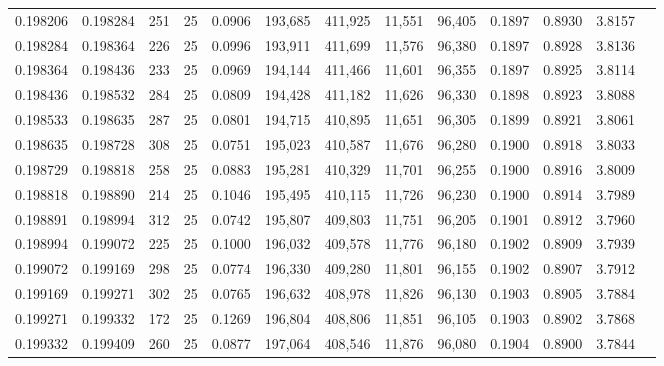 \begin{tabular}{rrrrrrrrrrrrr}
0.198206 & 0.198284 &   251 &  25 &                                     0.0906 & 193,685 & 411,925 &  11,551 &  96,405 & 0.1897 & 0.8930 & 3.8157 \\
0.198284 & 0.198364 &   226 &  25 &                                     0.0996 & 193,911 & 411,699 &  11,576 &  96,380 & 0.1897 & 0.8928 & 3.8136 \\
0.198364 & 0.198436 &   233 &  25 &                                     0.0969 & 194,144 & 411,466 &  11,601 &  96,355 & 0.1897 & 0.8925 & 3.8114 \\
0.198436 & 0.198532 &   284 &  25 &                                     0.0809 & 194,428 & 411,182 &  11,626 &  96,330 & 0.1898 & 0.8923 & 3.8088 \\
0.198533 & 0.198635 &   287 &  25 &                                     0.0801 & 194,715 & 410,895 &  11,651 &  96,305 & 0.1899 & 0.8921 & 3.8061 \\
0.198635 & 0.198728 &   308 &  25 &                                     0.0751 & 195,023 & 410,587 &  11,676 &  96,280 & 0.1900 & 0.8918 & 3.8033 \\
0.198729 & 0.198818 &   258 &  25 &                                     0.0883 & 195,281 & 410,329 &  11,701 &  96,255 & 0.1900 & 0.8916 & 3.8009 \\
0.198818 & 0.198890 &   214 &  25 &                                     0.1046 & 195,495 & 410,115 &  11,726 &  96,230 & 0.1900 & 0.8914 & 3.7989 \\
0.198891 & 0.198994 &   312 &  25 &                                     0.0742 & 195,807 & 409,803 &  11,751 &  96,205 & 0.1901 & 0.8912 & 3.7960 \\
0.198994 & 0.199072 &   225 &  25 &                                     0.1000 & 196,032 & 409,578 &  11,776 &  96,180 & 0.1902 & 0.8909 & 3.7939 \\
0.199072 & 0.199169 &   298 &  25 &                                     0.0774 & 196,330 & 409,280 &  11,801 &  96,155 & 0.1902 & 0.8907 & 3.7912 \\
0.199169 & 0.199271 &   302 &  25 &                                     0.0765 & 196,632 & 408,978 &  11,826 &  96,130 & 0.1903 & 0.8905 & 3.7884 \\
0.199271 & 0.199332 &   172 &  25 &                                     0.1269 & 196,804 & 408,806 &  11,851 &  96,105 & 0.1903 & 0.8902 & 3.7868 \\
0.199332 & 0.199409 &   260 &  25 &                                     0.0877 & 197,064 & 408,546 &  11,876 &  96,080 & 0.1904 & 0.8900 & 3.7844 \\

\end{tabular}
